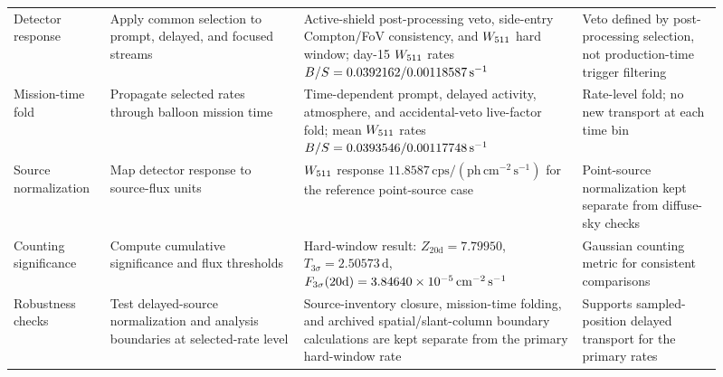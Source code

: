 \begin{table}[t]
\begin{tabular}{@{}p{0.12\linewidth}p{0.25\linewidth}p{0.36\linewidth}p{0.18\linewidth}@{}}
Detector response & Apply common selection to prompt, delayed, and focused streams & Active-shield post-processing veto, side-entry Compton/FoV consistency, and $W_{511}$ hard window; day-15 $W_{511}$ rates $B/S=0.0392162/0.00118587\,\mathrm{s^{-1}}$ & Veto defined by post-processing selection, not production-time trigger filtering \\
Mission-time fold & Propagate selected rates through balloon mission time & Time-dependent prompt, delayed activity, atmosphere, and accidental-veto live-factor fold; mean $W_{511}$ rates $B/S=0.0393546/0.00117748\,\mathrm{s^{-1}}$ & Rate-level fold; no new transport at each time bin \\
Source normalization & Map detector response to source-flux units & $W_{511}$ response $11.8587\,\mathrm{cps}/(\mathrm{ph\,cm^{-2}\,s^{-1}})$ for the reference point-source case & Point-source normalization kept separate from diffuse-sky checks \\
Counting significance & Compute cumulative significance and flux thresholds & Hard-window result: $Z_{20\mathrm{d}}=7.79950$, $T_{3\sigma}=2.50573\,\mathrm{d}$, $F_{3\sigma}(20\mathrm{d})=3.84640\times10^{-5}\,\mathrm{cm^{-2}\,s^{-1}}$ & Gaussian counting metric for consistent comparisons \\
Robustness checks & Test delayed-source normalization and analysis boundaries at selected-rate level & Source-inventory closure, mission-time folding, and archived spatial/slant-column boundary calculations are kept separate from the primary hard-window rate & Supports sampled-position delayed transport for the primary rates \\
\bottomrule
\end{tabular}
\endgroup
\end{table}
